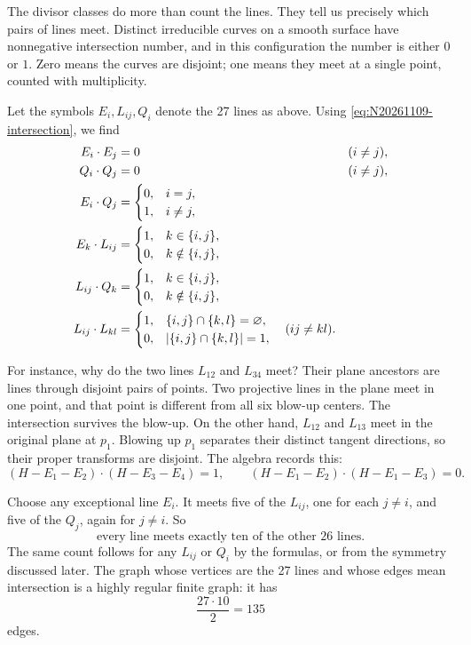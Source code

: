 The divisor classes do more than count the lines. They tell us precisely which pairs of lines meet. Distinct irreducible curves on a smooth surface have nonnegative intersection number, and in this configuration the number is either \(0\) or \(1\). Zero means the curves are disjoint; one means they meet at a single point, counted with multiplicity.

Let the symbols \(E_i,L_{ij},Q_i\) denote the 27 lines as above. Using \eqref{eq:N20261109-intersection}, we find
\begin{align}
 E_i\cdot E_j&=0 &&(i\ne j),\notag\\
 Q_i\cdot Q_j&=0 &&(i\ne j),\notag\\
 E_i\cdot Q_j&=
 \begin{cases}0,&i=j,\\1,&i\ne j,\end{cases}\notag\\
 E_k\cdot L_{ij}&=
 \begin{cases}1,&k\in\{i,j\},\\0,&k\notin\{i,j\},\end{cases}
 \label{eq:N20261109-incidence}\\
 L_{ij}\cdot Q_k&=
 \begin{cases}1,&k\in\{i,j\},\\0,&k\notin\{i,j\},\end{cases}\notag\\
 L_{ij}\cdot L_{kl}&=
 \begin{cases}1,&\{i,j\}\cap\{k,l\}=\varnothing,\\
 0,&|\{i,j\}\cap\{k,l\}|=1,
 \end{cases}
 \quad (ij\ne kl).\notag
\end{align}

For instance, why do the two lines \(L_{12}\) and \(L_{34}\) meet? Their plane ancestors are lines through disjoint pairs of points. Two projective lines in the plane meet in one point, and that point is different from all six blow-up centers. The intersection survives the blow-up. On the other hand, \(L_{12}\) and \(L_{13}\) meet in the original plane at \(p_1\). Blowing up \(p_1\) separates their distinct tangent directions, so their proper transforms are disjoint. The algebra records this:
\[
 (H-E_1-E_2)\cdot(H-E_3-E_4)=1,\qquad
 (H-E_1-E_2)\cdot(H-E_1-E_3)=0.
\]

Choose any exceptional line \(E_i\). It meets five of the \(L_{ij}\), one for each \(j\ne i\), and five of the \(Q_j\), again for \(j\ne i\). So
\[
 \boxed{\text{every line meets exactly ten of the other 26 lines}.}
\]
The same count follows for any \(L_{ij}\) or \(Q_i\) by the formulas, or from the symmetry discussed later. The graph whose vertices are the 27 lines and whose edges mean intersection is a highly regular finite graph: it has
\[
 \frac{27\cdot10}{2}=135
\]
edges.

